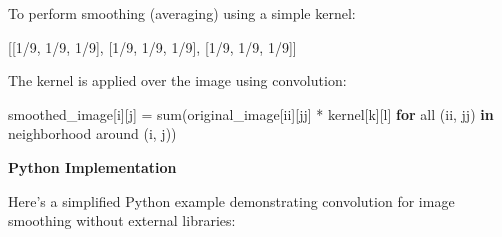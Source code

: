 \documentclass[
  letterpaper,
  DIV=11,
  numbers=noendperiod]{scrreprt}
\newenvironment{Shaded}{\begin{snugshade}}{\end{snugshade}}
\newcommand{\BuiltInTok}[1]{\textcolor[rgb]{0.00,0.23,0.31}{#1}}
\newcommand{\ControlFlowTok}[1]{\textcolor[rgb]{0.00,0.23,0.31}{\textbf{#1}}}
\newcommand{\DecValTok}[1]{\textcolor[rgb]{0.68,0.00,0.00}{#1}}
\newcommand{\KeywordTok}[1]{\textcolor[rgb]{0.00,0.23,0.31}{\textbf{#1}}}
\newcommand{\NormalTok}[1]{\textcolor[rgb]{0.00,0.23,0.31}{#1}}
\newcommand{\OperatorTok}[1]{\textcolor[rgb]{0.37,0.37,0.37}{#1}}
\theoremstyle{plain}
\theoremstyle{definition}
\theoremstyle{remark}
\begin{document}
To perform smoothing (averaging) using a simple kernel:

\begin{Shaded}
\begin{Highlighting}[]
\NormalTok{[[}\DecValTok{1}\OperatorTok{/}\DecValTok{9}\NormalTok{, }\DecValTok{1}\OperatorTok{/}\DecValTok{9}\NormalTok{, }\DecValTok{1}\OperatorTok{/}\DecValTok{9}\NormalTok{],}
\NormalTok{ [}\DecValTok{1}\OperatorTok{/}\DecValTok{9}\NormalTok{, }\DecValTok{1}\OperatorTok{/}\DecValTok{9}\NormalTok{, }\DecValTok{1}\OperatorTok{/}\DecValTok{9}\NormalTok{],}
\NormalTok{ [}\DecValTok{1}\OperatorTok{/}\DecValTok{9}\NormalTok{, }\DecValTok{1}\OperatorTok{/}\DecValTok{9}\NormalTok{, }\DecValTok{1}\OperatorTok{/}\DecValTok{9}\NormalTok{]]}
\end{Highlighting}
\end{Shaded}

The kernel is applied over the image using convolution:

\begin{Shaded}
\begin{Highlighting}[]
\NormalTok{smoothed\_image[i][j] }\OperatorTok{=} \BuiltInTok{sum}\NormalTok{(original\_image[ii][jj] }\OperatorTok{*}\NormalTok{ kernel[k][l] }\ControlFlowTok{for} \BuiltInTok{all}\NormalTok{ (ii, jj) }\KeywordTok{in}\NormalTok{ neighborhood around (i, j))}
\end{Highlighting}
\end{Shaded}

\textbf{Python Implementation}

Here's a simplified Python example demonstrating convolution for image
smoothing without external libraries:
\end{document}
